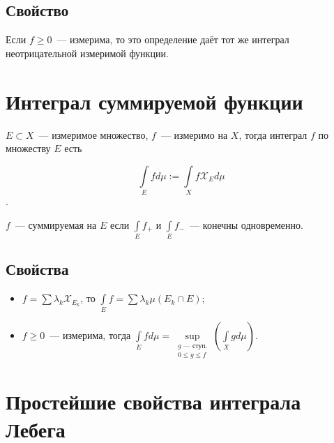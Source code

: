 \documentclass{article}
\begin{document}
        \subsection{Свойство}
                
            Если $f \geqslant 0$~--- измерима, то это определение даёт тот же интеграл неотрицательной измеримой функции.
            
    \newpage
                
    \section{Интеграл суммируемой функции}
        
        $E \subset X$~--- измеримое множество, $f$~--- измеримо на $X$, тогда интеграл $f$ по множеству $E$ есть
        
        $$\int\limits_{E} f d \mu := \int\limits_{X} f \mathcal{X}_E d \mu$$. 
        
        $f$~--- суммируемая на $E$ если $\int\limits_{E} f_+$ и $\int\limits_{E} f_-$~--- конечны одновременно.
            
        \subsection{Свойства} 
                
            \begin{itemize}
                    
                \item $f = \sum \lambda_k \mathcal{X}_{E_k}$, то $\int\limits_{E} f = \sum \lambda_k \mu \left( E_k \cap E \right)$;
                
                \item $f \geqslant 0$~--- измерима, тогда $\int\limits_{E} f d \mu = \sup\limits_{\substack{\text{$g$~--- ступ.} \\ 0 \leqslant g \leqslant f}} \left( \int\limits_{X} g d \mu \right)$.
                        
            \end{itemize}
                    
    \newpage
        
    \section{Простейшие свойства интеграла Лебега}
    
\end{document}
